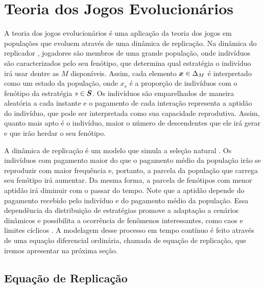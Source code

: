 \chapter{Teoria dos Jogos Evolucionários}

A teoria dos jogos evolucionários é uma aplicação da teoria dos jogos em populações que evoluem através de uma dinâmica de replicação. Na dinâmica do replicador \cite{hofbauer_sigmund_1998}, jogadores são membros de uma grande população, onde indivíduos são caracterizados pelo seu fenótipo, que determina qual estratégia o indivíduo irá usar dentre as $M$ disponíveis. Assim, cada elemento $\boldsymbol{x}\in\Delta_M$ é interpretado como um estado da população, onde $x_s$ é a proporção de indivíduos com o fenótipo da estratégia $s\in\boldsymbol{S}$. Os indivíduos são emparelhados de maneira aleatória a cada instante e o pagamento de cada interação representa a aptidão do indivíduo, que pode ser interpretada como sua capacidade reprodutiva. Assim, quanto mais apto é o indivíduo, maior o número de descendentes que ele irá gerar e que irão herdar o seu fenótipo.

A dinâmica de replicação é um modelo que simula a seleção natural \cite{madeo2015}. Os indivíduos com pagamento maior do que o pagamento médio da população irão se reproduzir com maior frequência e, portanto, a parcela da população que carrega seu fenótipo irá aumentar. Da mesma forma, a parcela de fenótipos com menor aptidão irá diminuir com o passar do tempo. Note que a aptidão depende do pagamento recebido pelo indivíduo e do pagamento médio da população. Essa dependência da distribuição de estratégias promove a adaptação a cenários dinâmicos e possibilita a ocorrência de fenômenos interessantes, como caos e limites cíclicos \cite{hofbauer_sigmund_1998}. A modelagem desse processo em tempo contínuo é feito através de uma equação diferencial ordinária, chamada de equação de replicação, que iremos apresentar na próxima seção.


\section{Equação de Replicação}

